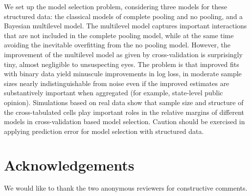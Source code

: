 \documentclass[sii]{ipart}
\begin{document}
We set up the model selection problem, considering three models for these structured data:  the classical models of complete pooling and no pooling,
and a Bayesian multilevel model.  The multilevel
model captures important interactions that are not included in the complete
pooling model, while at the same time avoiding the inevitable overfitting from
the no pooling model. However, the improvement of the multilevel model as given
by cross-validation is surprisingly tiny, almost negligible to unsuspecting eyes.
The problem is that improved fits with binary data yield minuscule improvements
in log loss, in moderate sample sizes nearly indistinguishable from noise even if
the improved estimates are substantively important when aggregated (for example,
state-level public opinion).  Simulations based on real data show that
sample size and structure of the cross-tabulated cells play important roles in
the relative margins of different models in cross-validation based model
selection. Caution should be exercised in applying prediction error for model
selection with structured data.
\section*{Acknowledgements}
We would like to thank the two anonymous reviewers for constructive comments.



\end{document}
